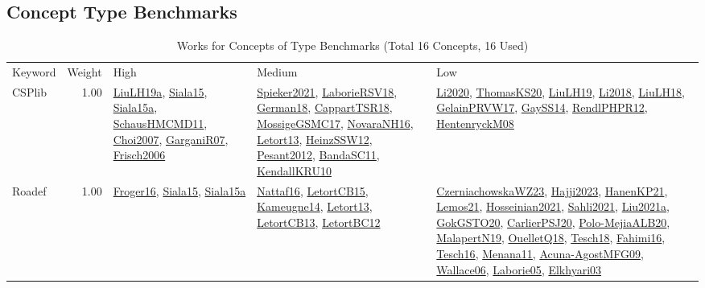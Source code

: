 \subsection{Concept Type Benchmarks}
\label{sec:Benchmarks}
\label{Benchmarks}
{\scriptsize
\begin{longtable}{p{3cm}r>{\raggedright\arraybackslash}p{6cm}>{\raggedright\arraybackslash}p{6cm}>{\raggedright\arraybackslash}p{8cm}}
\rowcolor{white}\caption{Works for Concepts of Type Benchmarks (Total 16 Concepts, 16 Used)}\\ \toprule
\rowcolor{white}Keyword & Weight & High & Medium & Low\\ \midrule\endhead
\bottomrule
\endfoot
\index{CSPlib}\index{Benchmarks!CSPlib}CSPlib &  1.00 & \hyperref[detail:LiuLH19a]{LiuLH19a}, \hyperref[detail:Siala15]{Siala15}, \hyperref[detail:Siala15a]{Siala15a}, \hyperref[detail:SchausHMCMD11]{SchausHMCMD11}, \hyperref[detail:Choi2007]{Choi2007}, \hyperref[detail:GarganiR07]{GarganiR07}, \hyperref[detail:Frisch2006]{Frisch2006} & \hyperref[detail:Spieker2021]{Spieker2021}, \hyperref[detail:LaborieRSV18]{LaborieRSV18}, \hyperref[detail:German18]{German18}, \hyperref[detail:CappartTSR18]{CappartTSR18}, \hyperref[detail:MossigeGSMC17]{MossigeGSMC17}, \hyperref[detail:NovaraNH16]{NovaraNH16}, \hyperref[detail:Letort13]{Letort13}, \hyperref[detail:HeinzSSW12]{HeinzSSW12}, \hyperref[detail:Pesant2012]{Pesant2012}, \hyperref[detail:BandaSC11]{BandaSC11}, \hyperref[detail:KendallKRU10]{KendallKRU10} & \hyperref[detail:Li2020]{Li2020}, \hyperref[detail:ThomasKS20]{ThomasKS20}, \hyperref[detail:LiuLH19]{LiuLH19}, \hyperref[detail:Li2018]{Li2018}, \hyperref[detail:LiuLH18]{LiuLH18}, \hyperref[detail:GelainPRVW17]{GelainPRVW17}, \hyperref[detail:GaySS14]{GaySS14}, \hyperref[detail:RendlPHPR12]{RendlPHPR12}, \hyperref[detail:HentenryckM08]{HentenryckM08}\\
\index{Roadef}\index{Benchmarks!Roadef}Roadef &  1.00 & \hyperref[detail:Froger16]{Froger16}, \hyperref[detail:Siala15]{Siala15}, \hyperref[detail:Siala15a]{Siala15a} & \hyperref[detail:Nattaf16]{Nattaf16}, \hyperref[detail:LetortCB15]{LetortCB15}, \hyperref[detail:Kameugne14]{Kameugne14}, \hyperref[detail:Letort13]{Letort13}, \hyperref[detail:LetortCB13]{LetortCB13}, \hyperref[detail:LetortBC12]{LetortBC12} & \hyperref[detail:CzerniachowskaWZ23]{CzerniachowskaWZ23}, \hyperref[detail:Hajji2023]{Hajji2023}, \hyperref[detail:HanenKP21]{HanenKP21}, \hyperref[detail:Lemos21]{Lemos21}, \hyperref[detail:Hosseinian2021]{Hosseinian2021}, \hyperref[detail:Sahli2021]{Sahli2021}, \hyperref[detail:Liu2021a]{Liu2021a}, \hyperref[detail:GokGSTO20]{GokGSTO20}, \hyperref[detail:CarlierPSJ20]{CarlierPSJ20}, \hyperref[detail:Polo-MejiaALB20]{Polo-MejiaALB20}, \hyperref[detail:MalapertN19]{MalapertN19}, \hyperref[detail:OuelletQ18]{OuelletQ18}, \hyperref[detail:Tesch18]{Tesch18}, \hyperref[detail:Fahimi16]{Fahimi16}, \hyperref[detail:Tesch16]{Tesch16}, \hyperref[detail:Menana11]{Menana11}, \hyperref[detail:Acuna-AgostMFG09]{Acuna-AgostMFG09}, \hyperref[detail:Wallace06]{Wallace06}, \hyperref[detail:Laborie05]{Laborie05}, \hyperref[detail:Elkhyari03]{Elkhyari03}\\

\end{longtable}}
